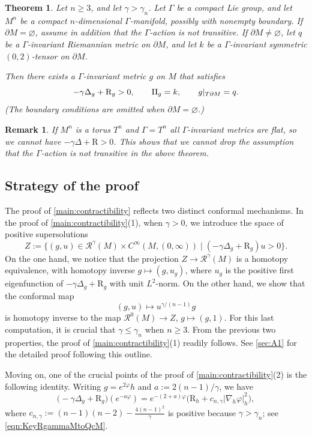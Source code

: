 \documentclass[11pt]{amsart}
\numberwithin{equation}{section}
\newtheorem{remark}[theorem]{Remark}
\newtheorem{bigthm}{Theorem}
\newcommand{\scal}{\mathrm{R}}
\let\geq\geqslant
\let\leq\leqslant
\begin{document}
\begin{bigthm}\label{main:existence-with-invariance-and-boundary}
    Let $n\geq 3$, and let $\gamma>\gamma_n$. Let $\Gamma$ be a compact Lie group,  and let $M^n$ be a compact $n$-dimensional $\Gamma$-manifold, possibly with nonempty boundary. 
    If $\partial M=\varnothing$, assume in addition that the $\Gamma$-action is not transitive. If $\partial M\neq \varnothing$, let $q$ be a $\Gamma$-invariant Riemannian metric on $\partial M$, and let
$k$ be a $\Gamma$-invariant symmetric $(0,2)$-tensor on $\partial M$.

    Then there exists a $\Gamma$-invariant metric $g$ on $M$ that satisfies
    \[
    -\gamma\Delta_g+\scal_g>0, \qquad {\rm II}_g =k, \qquad g|_{T\partial M}=q.
    \]
    (The boundary conditions are omitted when $\partial M=\varnothing$.)
\end{bigthm}

\begin{remark} If $M^n$ is a torus $T^n$ and $\Gamma=T^n$ all $\Gamma$-invariant metrics are flat, so we cannot have $-\gamma\Delta+\scal>0$.
This shows that we cannot drop the assumption that the $\Gamma$-action is not transitive in the above theorem.
\end{remark}

\subsection{Strategy of the proof}
The proof of \cref{main:contractibility} reflects two distinct conformal mechanisms. In the proof of \cref{main:contractibility}(1), when $\gamma>0$, we introduce the space of positive supersolutions
\[
Z := \bigl\{(g,u)\in \mathcal R^\gamma(M)\times C^\infty(M,(0,\infty))\mid (-\gamma\Delta_g+\scal_g)u>0\bigr\}.
\]
On the one hand, we notice that the projection $Z\to\mathcal R^\gamma(M)$ is a homotopy equivalence, with homotopy inverse $g\mapsto (g,u_g)$, where $u_g$ is the positive first eigenfunction of $-\gamma\Delta_g+\scal_g$ with unit $L^2$-norm. On the other hand, we show that the conformal map
\[
(g,u)\longmapsto u^{\gamma/(n-1)}g
\]
is homotopy inverse to the map $\mathcal R^0(M)\to Z$, $g\mapsto(g,1)$. For this last computation, it is crucial that $\gamma\leq\gamma_n$ when $n\geq 3$. From the previous two properties, the proof of \cref{main:contractibility}(1) readily follows. See \cref{sec:A1} for the detailed proof following this outline.
\smallskip

Moving on, one of the crucial points of the proof of \cref{main:contractibility}(2) is the following identity. 
Writing $g=e^{2\varphi}h$ and $a:=2(n-1)/\gamma$, we have
\begin{equation}\label{eq:key-identity-intro}
\bigl(-\gamma\Delta_g+\scal_g\bigr)(e^{-a\varphi})
=
e^{-(2+a)\varphi}
\bigl(\scal_h+c_{n,\gamma}|\nabla_h\varphi|_h^2\bigr),
\end{equation}
where $
c_{n,\gamma}:=(n-1)(n-2)-\frac{4(n-1)^2}{\gamma}$ is positive because $\gamma>\gamma_n$; see \eqref{eqn:KeyRgammaMtoQcM}.
\end{document}
